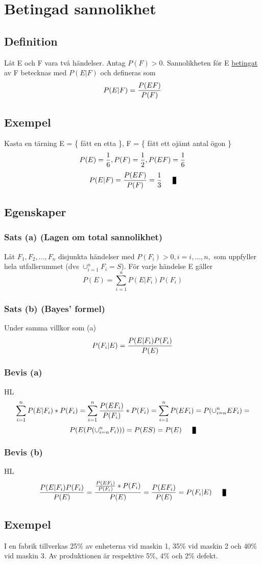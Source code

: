 \documentclass{article}
\begin{document}
\section{Betingad sannolikhet}
\subsection{Definition}
Låt E och F vara två händelser.
Antag $P(F)>0$. Sannolikheten för E \underline{betingat} av F betecknas med $P(E|F)$ och defineras som
$$ P(E|F) = \frac{P(EF)}{P(F)} $$
\subsection{Exempel}
Kasta en tärning E = \{ fått en etta \}, F = \{ fått ett ojämt antal ögon \}
$$ P(E) = \frac{1}{6}, P(F) = \frac{1}{2}, P(EF) = \frac{1}{6} $$
$$ P(E|F) = \f{P(EF)}{P(F)} = \f13 \qed $$
\subsection{Egenskaper}
\subsubsection{Sats (a) (Lagen om total sannolikhet)}
Låt $F_1, F_2, \dots, F_n$ disjunkta händelser med $P(F_i)>0, i=i,\dots,n,$ som uppfyller hela utfallsrummet (dvs $\cup^n_{i=1}F_i = S$). För varje händelse E gäller
$$ P(E) = \sum_{i=1}^{n} P(E|F_i)P(F_i) $$

\subsubsection{Sats (b) (Bayes' formel)}
Under samma villkor som (a)
$$ P(F_i|E) = \frac{P(E|F_i)P(F_i)}{P(E)} $$

\subsubsection{Bevis (a)}
HL
$$ \sum_{i=1}^{n} P(E|F_i)*P(F_i) = \sum_{i=1}^{n} \frac{P(EF_i)}{P(F_i)}*P(F_i) = \sum_{i=1}^{n} P(EF_i) = P(\cup^n_{i=n}EF_i) = $$
$$ P(E(P(\cup^n_{i=n}F_i))) = P(ES) = P(E) \qed$$

\subsubsection{Bevis (b)}
HL
$$ \f{P(E|F_i)P(F_i)}{P(E)} = \f{\f{P(EF_i)}{P(F_i)}*P(F_i)}{P(E)} = \f{P(EF_i)}{P(E)} = P(F_i|E) \qed $$

\subsection{Exempel}
I en fabrik tillverkas 25\% av enheterna vid maskin 1, 35\% vid maskin 2 och 40\% vid maskin 3. Av produktionen är respektive 5\%, 4\% och 2\% defekt.\\
\end{document}
